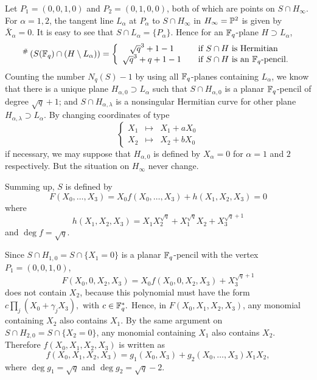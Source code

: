 \documentclass[a4paper,11pt]{article}
\begin{document}
Let $P_1=(0,0,1,0)$ and $P_2=(0,1,0,0)$, both of which are points
on $S \cap H_{\infty}$.
For $\alpha = 1, 2$, the tangent line $L_{\alpha}$
at $P_{\alpha}$ to $S\cap H_{\infty}$ in $H_{\infty}={\Bbb P}^2$
is given by $\bar{X}_{\alpha}=0$.
It is easy to see that $S \cap L_{\alpha}= \{ P_{\alpha} \}$.
Hence for an ${\Bbb F}_q$-plane $H \supset L_{\alpha}$,
\[
{}^{\#} \left(
 S({\Bbb F}_q) \cap (H \setminus L_{\alpha})
\right)
=
\left\{
  \begin{array}{ccl}
  \sqrt{q}^3 + 1 -1 & & \mbox{\rm if $S\cap H$ is Hermitian}\\
  \sqrt{q}^3 +q +1 -1& & \mbox{\rm if $S\cap H$ is an ${\Bbb F}_q$-pencil}.
  \end{array}
\right. 
\]
Counting the number $N_q(S) -1$ by using all ${\Bbb F}_q$-planes
containing $L_{\alpha}$,
we know that there is a unique plane $H_{\alpha, 0} \supset L_{\alpha}$
such that $S \cap H_{\alpha, 0}$ is a planar ${\Bbb F}_q$-pencil
of degree $\sqrt{q}+1$;
and $S \cap H_{\alpha, \lambda }$ is a nonsingular Hermitian curve
for other plane $H_{\alpha, \lambda} \supset  L_{\alpha}$.
By changing coordinates of type
\[
\left\{
  \begin{array}{ccc}
   X_1 & \mapsto & X_1 + a X_0 \\
   X_2 & \mapsto & X_2 + b X_0
  \end{array}
\right.
\]
if necessary,
we may suppose that $H_{\alpha, 0}$
is defined by $X_{\alpha}=0$ for $\alpha =1$ and $2$ respectively.
But the situation on $H_{\infty}$ never change.

Summing up, $S$ is defined by
\[
F(X_0, \dots , X_3)
 = X_0 f(X_0, \dots , X_3) + h(X_1, X_2, X_3) =0
\]
where
\[
h(X_1, X_2, X_3)= X_1 X_2^{\sqrt{q}} + X_1^{\sqrt{q}}X_2 + X_3^{\sqrt{q}+1}
\]
and $\deg f = \sqrt{q}$.

Since $S \cap H_{1, 0} = S \cap \{ X_1 = 0 \}$ is a planar ${\Bbb F}_q$-pencil with
the vertex $P_1= (0,0,1,0)$,
\[
F(X_0, 0, X_2 , X_3) =
    X_0 f(X_0, 0, X_2 , X_3) + X_3^{\sqrt{q}+1}
\]
does not contain $X_2$,
because this polynomial must have the form
$ c \prod_j (X_0+\gamma_j X_3),$
with $c \in {\Bbb F}_q^{\ast}.$
Hence, in $F(X_0, X_1, X_2, X_3)$, any monomial containing $X_2$
also contains $X_1$.
By the same argument on $S \cap H_{2, 0} =S \cap \{ X_2 = 0 \}$,
any monomial containing $X_1$
also contains $X_2$.
Therefore $f(X_0, X_1, X_2, X_3)$
is written as
\[
f(X_0, X_1, X_2, X_3) = g_1(X_0, X_3) + g_2(X_0, \dots , X_3)X_1X_2,
\]
where $\deg g_1 = \sqrt{q}$ and $\deg g_2 = \sqrt{q}-2$.
\end{document}
